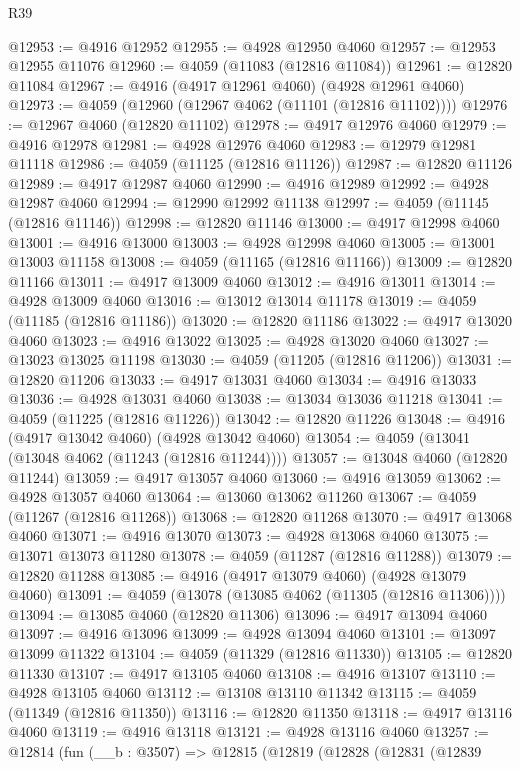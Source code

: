 \begin{lexlean}{R39}
\begin{coremodule}
@12953 := @4916 @12952
@12955 := @4928 @12950 @4060
@12957 := @12953 @12955 @11076
@12960 := @4059 (@11083 (@12816 @11084))
@12961 := @12820 @11084
@12967 := @4916 (@4917 @12961 @4060) (@4928 @12961 @4060)
@12973 := @4059 (@12960 (@12967 @4062 (@11101 (@12816 @11102))))
@12976 := @12967 @4060 (@12820 @11102)
@12978 := @4917 @12976 @4060
@12979 := @4916 @12978
@12981 := @4928 @12976 @4060
@12983 := @12979 @12981 @11118
@12986 := @4059 (@11125 (@12816 @11126))
@12987 := @12820 @11126
@12989 := @4917 @12987 @4060
@12990 := @4916 @12989
@12992 := @4928 @12987 @4060
@12994 := @12990 @12992 @11138
@12997 := @4059 (@11145 (@12816 @11146))
@12998 := @12820 @11146
@13000 := @4917 @12998 @4060
@13001 := @4916 @13000
@13003 := @4928 @12998 @4060
@13005 := @13001 @13003 @11158
@13008 := @4059 (@11165 (@12816 @11166))
@13009 := @12820 @11166
@13011 := @4917 @13009 @4060
@13012 := @4916 @13011
@13014 := @4928 @13009 @4060
@13016 := @13012 @13014 @11178
@13019 := @4059 (@11185 (@12816 @11186))
@13020 := @12820 @11186
@13022 := @4917 @13020 @4060
@13023 := @4916 @13022
@13025 := @4928 @13020 @4060
@13027 := @13023 @13025 @11198
@13030 := @4059 (@11205 (@12816 @11206))
@13031 := @12820 @11206
@13033 := @4917 @13031 @4060
@13034 := @4916 @13033
@13036 := @4928 @13031 @4060
@13038 := @13034 @13036 @11218
@13041 := @4059 (@11225 (@12816 @11226))
@13042 := @12820 @11226
@13048 := @4916 (@4917 @13042 @4060) (@4928 @13042 @4060)
@13054 := @4059 (@13041 (@13048 @4062 (@11243 (@12816 @11244))))
@13057 := @13048 @4060 (@12820 @11244)
@13059 := @4917 @13057 @4060
@13060 := @4916 @13059
@13062 := @4928 @13057 @4060
@13064 := @13060 @13062 @11260
@13067 := @4059 (@11267 (@12816 @11268))
@13068 := @12820 @11268
@13070 := @4917 @13068 @4060
@13071 := @4916 @13070
@13073 := @4928 @13068 @4060
@13075 := @13071 @13073 @11280
@13078 := @4059 (@11287 (@12816 @11288))
@13079 := @12820 @11288
@13085 := @4916 (@4917 @13079 @4060) (@4928 @13079 @4060)
@13091 := @4059 (@13078 (@13085 @4062 (@11305 (@12816 @11306))))
@13094 := @13085 @4060 (@12820 @11306)
@13096 := @4917 @13094 @4060
@13097 := @4916 @13096
@13099 := @4928 @13094 @4060
@13101 := @13097 @13099 @11322
@13104 := @4059 (@11329 (@12816 @11330))
@13105 := @12820 @11330
@13107 := @4917 @13105 @4060
@13108 := @4916 @13107
@13110 := @4928 @13105 @4060
@13112 := @13108 @13110 @11342
@13115 := @4059 (@11349 (@12816 @11350))
@13116 := @12820 @11350
@13118 := @4917 @13116 @4060
@13119 := @4916 @13118
@13121 := @4928 @13116 @4060
@13257 := @12814
    (fun (__b : @3507) =>
    @12815
      (@12819
        (@12828
          (@12831
            (@12839

\end{coremodule}
\end{lexlean}

